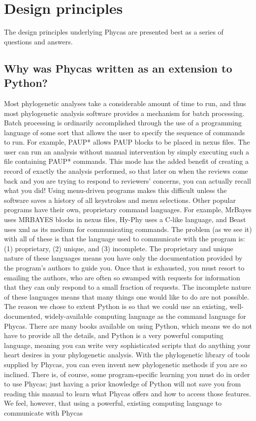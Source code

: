 \documentclass[10pt]{article}
\begin{document}
\section{Design principles}\label{sec:designprinciples}

The design principles underlying Phycas are presented best as a series of questions and answers.

\subsection{Why was Phycas written as an extension to Python?}
Most phylogenetic analyses take a considerable amount of time to run, and thus most phylogenetic analysis software provides a mechanism for batch processing. Batch processing is ordinarily accomplished through the use of a programming language of some sort that allows the user to specify the sequence of commands to run. For example, PAUP* allows PAUP blocks to be placed in nexus files. The user can run an analysis without manual intervention by simply executing such a file containing PAUP* commands. This mode has the added benefit of creating a record of exactly the analysis performed, so that later on when the reviews come back and you are trying to respond to reviewers' concerns, you can actually recall what you did! Using menu-driven programs makes this difficult unless the software saves a history of all keystrokes and menu selections. Other popular programs have their own, proprietary command languages. For example, MrBayes uses MRBAYES blocks in nexus files, Hy-Phy uses a C-like language, and Beast uses xml as its medium for communicating commands. The problem (as we see it) with all of these is that the language used to communicate with the program is: (1) proprietary, (2) unique, and (3) incomplete. The proprietary and unique nature of these languages means you have only the documentation provided by the program's authors to guide you. Once that is exhausted, you must resort to emailing the authors, who are often so swamped with requests for information that they can only respond to a small fraction of requests. The incomplete nature of these languages means that many things one would like to do are not possible. The reason we chose to extent Python is so that we could use an existing, well-documented, widely-available computing language as the command language for Phycas. There are many books available on using Python, which means we do not have to provide all the details, and Python is a very powerful computing language, meaning you can write very sophisticated scripts that do anything your heart desires in your phylogenetic analysis. With the phylogenetic library of tools supplied by Phycas, you can even invent new phylogenetic methods if you are so inclined. There is, of course, some program-specific learning you must do in order to use Phycas; just having a prior knowledge of Python will not save you from reading this manual to learn what Phycas offers and how to access those features. We feel, however, that using a powerful, existing computing language to communicate with Phycas 
\end{document}
